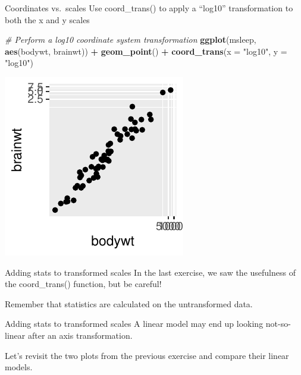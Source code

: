 \documentclass[
  ignorenonframetext,
]{beamer}
\newenvironment{Shaded}{\begin{snugshade}}{\end{snugshade}}
\newcommand{\AttributeTok}[1]{\textcolor[rgb]{0.13,0.29,0.53}{#1}}
\newcommand{\CommentTok}[1]{\textcolor[rgb]{0.56,0.35,0.01}{\textit{#1}}}
\newcommand{\FunctionTok}[1]{\textcolor[rgb]{0.13,0.29,0.53}{\textbf{#1}}}
\newcommand{\NormalTok}[1]{#1}
\newcommand{\SpecialCharTok}[1]{\textcolor[rgb]{0.81,0.36,0.00}{\textbf{#1}}}
\newcommand{\StringTok}[1]{\textcolor[rgb]{0.31,0.60,0.02}{#1}}
\begin{document}
\begin{frame}[fragile]{Coordinates vs.~scales}
\label{coordinates-vs.-scales-6}
Use coord\_trans() to apply a ``log10'' transformation to both the x and
y scales


\begin{Shaded}
\begin{Highlighting}[]
\CommentTok{\# Perform a log10 coordinate system transformation}
\FunctionTok{ggplot}\NormalTok{(msleep, }\FunctionTok{aes}\NormalTok{(bodywt, brainwt)) }\SpecialCharTok{+} \FunctionTok{geom\_point}\NormalTok{() }\SpecialCharTok{+} \FunctionTok{coord\_trans}\NormalTok{(}\AttributeTok{x =} \StringTok{"log10"}\NormalTok{,}
    \AttributeTok{y =} \StringTok{"log10"}\NormalTok{)}
\end{Highlighting}
\end{Shaded}

\begin{center}\includegraphics[width=0.5\linewidth]{Figs/unnamed-chunk-50-1} \end{center}
\end{frame}

\begin{frame}{Adding stats to transformed scales}
\label{adding-stats-to-transformed-scales}
In the last exercise, we saw the usefulness of the coord\_trans()
function, but be careful!

Remember that statistics are calculated on the untransformed data.
\end{frame}

\begin{frame}{Adding stats to transformed scales}
\label{adding-stats-to-transformed-scales-1}
A linear model may end up looking not-so-linear after an axis
transformation.

Let's revisit the two plots from the previous exercise and compare their
linear models.
\end{frame}
\end{document}
